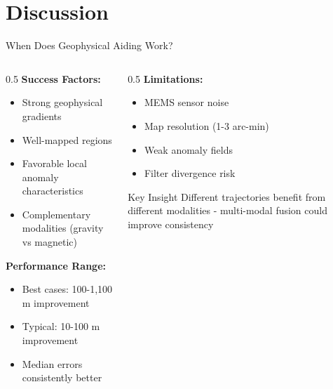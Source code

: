 \documentclass[aspectratio=169]{beamer}
\begin{document}
\section{Discussion}

\begin{frame}{When Does Geophysical Aiding Work?}
\begin{columns}[t]
\begin{column}{0.5\textwidth}
\textbf{Success Factors:}
\begin{itemize}
    \item Strong geophysical gradients
    \item Well-mapped regions
    \item Favorable local anomaly characteristics
    \item Complementary modalities (gravity vs magnetic)
\end{itemize}

\vspace{1em}

\textbf{Performance Range:}
\begin{itemize}
    \item Best cases: 100-1,100 m improvement
    \item Typical: 10-100 m improvement
    \item Median errors consistently better
\end{itemize}
\end{column}

\begin{column}{0.5\textwidth}
\textbf{Limitations:}
\begin{itemize}
    \item MEMS sensor noise
    \item Map resolution (1-3 arc-min)
    \item Weak anomaly fields
    \item Filter divergence risk
\end{itemize}

\vspace{1em}

\begin{block}{Key Insight}
Different trajectories benefit from different modalities - multi-modal fusion could improve consistency
\end{block}
\end{column}
\end{columns}
\end{frame}
\end{document}
